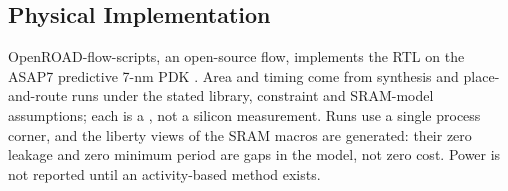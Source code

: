 \subsection{Physical Implementation}\label{sec:physical}

%
OpenROAD-flow-scripts, an open-source flow, implements the RTL on the ASAP7 predictive 7-nm PDK .
Area and timing come from synthesis and place-and-route runs under the stated library, constraint and SRAM-model assumptions; each is a \evPostRoute, not a silicon measurement.
Runs use a single process corner, and the liberty views of the SRAM macros are generated: their zero leakage and zero minimum period are gaps in the model, not zero cost.
Power is not reported until an activity-based method exists.
